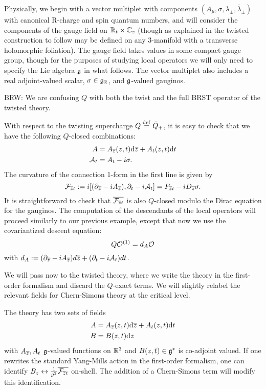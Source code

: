 \documentclass[11pt]{amsart}
\def\brian#1{{\textcolor{blue!65!red}{BRW: {#1}}}}
\begin{document}
Physically, we begin with a vector multiplet with components $(A_{\mu}, \sigma, \lambda_{\pm}, \bar{\lambda}_{\pm})$ with canonical R-charge and spin quantum numbers, and will consider the components of the gauge field on $\mathbb R_t \times \mathbb C_{z}$ (though as explained in \cite{ACNV} the twisted construction to follow may be defined on any 3-manifold with a transverse holomorphic foliation). The gauge field takes values in some compact gauge group, though for the purposes of studying local operators we will only need to specify the Lie algebra $\mathfrak g$ in what follows. The vector multiplet also includes a real adjoint-valued scalar, $\sigma \in \mathfrak g_{\mathbb R}$, and $\mathfrak g$-valued gauginos. 

\brian{We are confusing $Q$ with both the twist and the full BRST operator of the twisted theory.}

With respect to the twisting supercharge $Q \overset{\rm def}{=} \bar{Q}_+$, it is easy to check that we have the following $Q$-closed combinations:
\begin{align}
A & = A_{{\overline{z}}} (z,t) {\rm d} {\overline{z}} + A_{t} (z, t) {\rm d} t \\
\mathcal A_t &= A_t - i \sigma.
\end{align}
The curvature of the connection 1-form in the first line is given by
\[
\mathcal F_{{\overline{z}} t} := i  [(\partial_{{\overline{z}}} - i A_{{\overline{z}}}), \partial_t - i \mathcal A_t] = F_{{\overline{z}} t} - i D_{{\overline{z}}}\sigma.
\] It is straightforward to check that $\overline{\mathcal F_{{\overline{z}} t}}$ is also $Q$-closed modulo the Dirac equation for the gauginos. 
The computation of the descendants of the local operators will proceed similarly to our previous example, except that now we use the covariantized descent equation:
\[
Q \mathcal O^{(1)} = d_{A} \mathcal O
\] with $d_A := (\partial_{{\overline{z}}} - i A_{{\overline{z}}})d{\overline{z}} + (\partial_t - i \mathcal A_t)dt$. 

We will pass now to the twisted theory, where we write the theory in the first-order formalism and discard the $Q$-exact terms. We will slightly relabel the relevant fields for Chern-Simons theory at the critical level. 

The theory has two sets of fields
\begin{align*}
A & = A_{{\overline{z}}} (z,t) {\rm d} {\overline{z}} + A_{t} (z, t) {\rm d} t \\
B & = B (z,t) {\rm d} z 
\end{align*}
with $A_{{\overline{z}}}, A_t$ $\mathfrak g$-valued functions on $\mathbb R^3$ and $B(z,t) \in \mathfrak g^*$ is co-adjoint valued. If one rewrites the standard Yang-Mills action in the first-order formalism, one can identify $B_z \leftrightarrow {1 \over g^2} \overline{\mathcal F_{{\overline{z}} t}}$ on-shell. The addition of a Chern-Simons term will modify this identification. 
\end{document}
